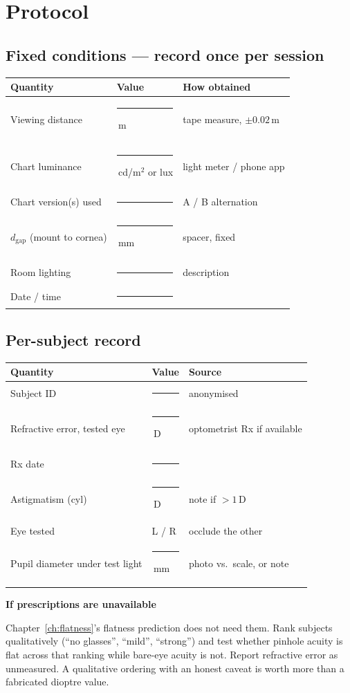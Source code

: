 \documentclass[11pt]{report}
\newenvironment{keybox}[1]%
{\par\vspace{8pt}\begin{lrbox}{\kbsave}\begin{minipage}{0.88\textwidth}%
{\bfseries\color{hbblue}#1}\par\vspace{4pt}\ignorespaces}%
{\end{minipage}\end{lrbox}%
\begin{center}\setlength{\fboxrule}{1.2pt}\setlength{\fboxsep}{8pt}%
\fcolorbox{hbblue}{boxgrey}{\usebox{\kbsave}}\end{center}\vspace{8pt}\par}
\begin{document}
\chapter{Protocol}

\section{Fixed conditions --- record once per session}

\begin{longtable}{p{5.5cm}p{4.0cm}p{4.5cm}}
\toprule
\textbf{Quantity} & \textbf{Value} & \textbf{How obtained} \\
\midrule
\endhead
Viewing distance & \rule{3cm}{0.4pt}\,m & tape measure, $\pm0.02$\,m \\
Chart luminance & \rule{3cm}{0.4pt}\,cd/m$^2$ or lux & light meter / phone app \\
Chart version(s) used & \rule{3cm}{0.4pt} & A / B alternation \\
$d_{\text{gap}}$ (mount to cornea) & \rule{3cm}{0.4pt}\,mm & spacer, fixed \\
Room lighting & \rule{3cm}{0.4pt} & description \\
Date / time & \rule{3cm}{0.4pt} & \\
\bottomrule
\end{longtable}

\section{Per-subject record}

\begin{longtable}{p{5.5cm}p{4.0cm}p{4.5cm}}
\toprule
\textbf{Quantity} & \textbf{Value} & \textbf{Source} \\
\midrule
\endhead
Subject ID & \rule{3cm}{0.4pt} & anonymised \\
Refractive error, tested eye & \rule{3cm}{0.4pt}\,D & optometrist Rx if available \\
Rx date & \rule{3cm}{0.4pt} & \\
Astigmatism (cyl) & \rule{3cm}{0.4pt}\,D & note if $>1$\,D \\
Eye tested & L / R & occlude the other \\
Pupil diameter under test light & \rule{3cm}{0.4pt}\,mm & photo vs.\ scale, or note \\
\bottomrule
\end{longtable}

\begin{keybox}{If prescriptions are unavailable}
Chapter~\ref{ch:flatness}'s flatness prediction does not need them. Rank subjects qualitatively
(``no glasses'', ``mild'', ``strong'') and test whether pinhole acuity is flat across that ranking
while bare-eye acuity is not. Report refractive error as unmeasured. A qualitative ordering with an
honest caveat is worth more than a fabricated dioptre value.
\end{keybox}
\end{document}
